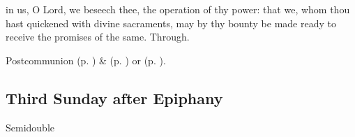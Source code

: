 \vspace{-0.4\baselineskip}

\postcommunion\label{EpiphanyIIPostcommunion}

\vspace{-0.1\baselineskip}

 in us, O Lord, we beseech thee, the operation of thy power: that we, whom thou hast quickened with divine sacraments, may by thy bounty be made ready to receive the promises of the same. Through.
\begin{rubric}
     Postcommunion  (p. \pageref{SPMaryPostChristmas}) \&   (p. \pageref{SPAgainst}) or  (p. \pageref{SPChiefBishop}).
\end{rubric}


\clearpage
\subsection{Third Sunday after Epiphany}\label{epiphany}
\begin{inhead}
{Semidouble}
\end{inhead}


